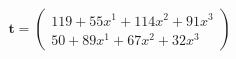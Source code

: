\documentclass[preview]{standalone}
\begin{document}
\begin{align*}
\mathbf{t} = \begin{pmatrix}119 + 55x^{1} + 114x^{2} + 91x^{3} \\ 50 + 89x^{1} + 67x^{2} + 32x^{3}\end{pmatrix}
\end{align*}
\end{document}
